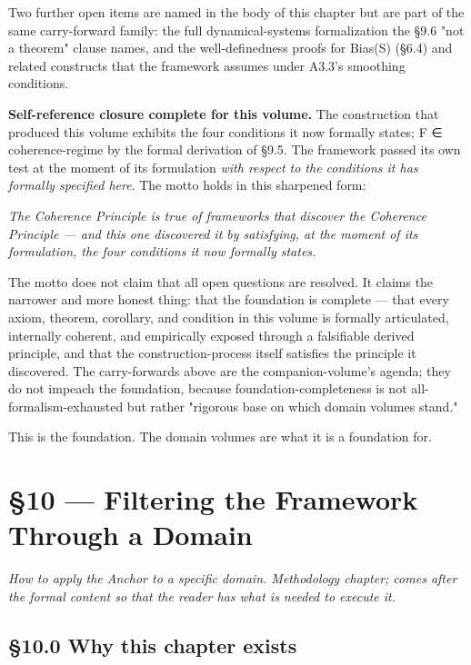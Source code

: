 \documentclass[11pt, openany]{book}
\renewenvironment{quote}{\begin{quoting}}{\end{quoting}}
\newcommand{\sectionbreak}{\clearpage}
\begin{document}
Two further open items are named in the body of this chapter but are part of the same carry-forward family: the full dynamical-systems formalization the §9.6 "not a theorem" clause names, and the well-definedness proofs for Bias(S) (§6.4) and related constructs that the framework assumes under A3.3's smoothing conditions.

\textbf{Self-reference closure complete for this volume.} The construction that produced this volume exhibits the four conditions it now formally states; F ∈ coherence-regime by the formal derivation of §9.5. The framework passed its own test at the moment of its formulation \textit{with respect to the conditions it has formally specified here}. The motto holds in this sharpened form:

\begin{quote}
\textit{The Coherence Principle is true of frameworks that discover the Coherence Principle --- and this one discovered it by satisfying, at the moment of its formulation, the four conditions it now formally states.}
\end{quote}

The motto does not claim that all open questions are resolved. It claims the narrower and more honest thing: that the foundation is complete --- that every axiom, theorem, corollary, and condition in this volume is formally articulated, internally coherent, and empirically exposed through a falsifiable derived principle, and that the construction-process itself satisfies the principle it discovered. The carry-forwards above are the companion-volume's agenda; they do not impeach the foundation, because foundation-completeness is not all-formalism-exhausted but rather "rigorous base on which domain volumes stand."

This is the foundation. The domain volumes are what it is a foundation for.

\chapter{§10 — Filtering the Framework Through a Domain}


\textit{How to apply the Anchor to a specific domain. Methodology chapter; comes after the formal content so that the reader has what is needed to execute it.}

\sectionbreak

\section{§10.0 Why this chapter exists}
\end{document}
